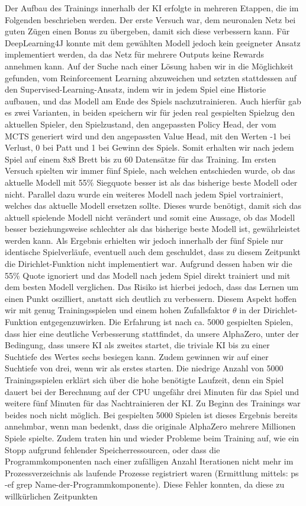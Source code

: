 \documentclass[12pt,a4paper]{article}
\begin{document}
Der Aufbau des Trainings innerhalb der KI erfolgte in mehreren Etappen, die im Folgenden beschrieben werden. Der erste Versuch war, dem neuronalen Netz bei guten Zügen einen Bonus zu übergeben, damit sich diese verbessern kann. Für DeepLearning4J konnte mit dem gewählten Modell jedoch kein geeigneter Ansatz implementiert werden, da das Netz für mehrere Outputs keine Rewards annehmen kann. Auf der Suche nach einer Lösung haben wir in \cite{Silver2017} die Möglichkeit gefunden, vom Reinforcement Learning abzuweichen und setzten stattdessen auf den Supervised-Learning-Ansatz, indem wir in jedem Spiel eine Historie aufbauen, und das Modell am Ende des Spiels nachzutrainieren. Auch hierfür gab es zwei Varianten, in beiden speichern wir für jeden real gespielten Spielzug den aktuellen Spieler, den Spielzustand, den angepassten Policy Head, der vom MCTS generiert wird und den angepassten Value Head, mit den Werten -1 bei Verlust, 0 bei Patt und 1 bei Gewinn des Spiels. Somit erhalten wir nach jedem Spiel auf einem 8x8 Brett bis zu 60 Datensätze für das Training. Im ersten Versuch spielten wir immer fünf Spiele, nach welchen entschieden wurde, ob das aktuelle Modell mit 55\% Siegquote besser ist als das bisherige beste Modell oder nicht. Parallel dazu wurde ein weiteres Modell nach jedem Spiel vortrainiert, welches das aktuelle Modell ersetzen sollte. Dieses wurde benötigt, damit sich das aktuell spielende Modell nicht verändert und somit eine Aussage, ob das Modell besser beziehungsweise schlechter als das bisherige beste Modell ist, gewährleistet werden kann. Als Ergebnis erhielten wir jedoch innerhalb der fünf Spiele nur identische Spielverläufe, eventuell auch dem geschuldet, dass zu diesem Zeitpunkt die Dirichlet-Funktion nicht implementiert war. Aufgrund dessen haben wir die 55\% Quote ignoriert und das Modell nach jedem Spiel direkt trainiert und mit dem besten Modell verglichen. Das Risiko ist hierbei jedoch, dass das Lernen um einen Punkt oszilliert, anstatt sich deutlich zu verbessern. Diesem Aspekt hoffen wir mit genug Trainingsspielen und einem hohen Zufallsfaktor $\theta$ in der Dirichlet-Funktion entgegenzuwirken. Die Erfahrung ist nach ca. 5000 gespielten Spielen, dass hier eine deutliche Verbesserung stattfindet, da unsere AlphaZero, unter der Bedingung, dass unsere KI als zweites startet, die triviale KI bis zu einer Suchtiefe des Wertes sechs besiegen kann. Zudem gewinnen wir auf einer Suchtiefe von drei, wenn wir als erstes starten. Die niedrige Anzahl von 5000 Trainingsspielen erklärt sich über die hohe benötigte Laufzeit, denn ein Spiel dauert bei der Berechnung auf der CPU ungefähr drei Minuten für das Spiel und weitere fünf Minuten für das Nachtrainieren der KI. Zu Beginn des Trainings war beides noch nicht möglich. Bei gespielten 5000 Spielen ist dieses Ergebnis bereits annehmbar, wenn man bedenkt, dass die originale AlphaZero mehrere Millionen Spiele spielte. Zudem traten hin und wieder Probleme beim Training auf, wie ein Stopp aufgrund fehlender Speicherressourcen, oder dass die Programmkomponenten nach einer zufälligen Anzahl Iterationen nicht mehr im Prozessverzeichnis als laufende Prozesse registriert waren (Ermittlung mittels: ps -ef\:  \textbar\: grep \glqq Name-der-Programmkomponente\grqq{}). Diese Fehler konnten, da diese zu willkürlichen Zeitpunkten 
\end{document}
